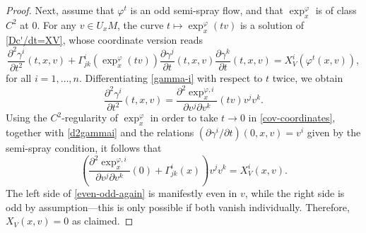 \documentclass[10pt,a4paper]{amsart}
\begin{document}
\begin{proof}
Next, assume that $\varphi^t$ is an odd semi-spray flow, and that $\exp_x^{\varphi}$ is of class $C^2$ at $0$.
For any $v\in U_xM$, the curve $t\mapsto \exp_x^{\varphi}(tv)$ is a solution of \eqref{Dc'/dt=XV}, whose coordinate version reads
\begin{equation}\label{cov-coordinates}
 \frac{\partial^2\gamma^i}{\partial t^2}(t,x,v) + \Gamma_{jk}^i(\exp_x^{\varphi}(tv)) \frac{\partial\gamma^j}{\partial t}(t,x,v)\frac{\partial \gamma^k}{\partial t}(t,x,v) = X^i_V(\varphi^t(x,v)),
\end{equation}for all $i=1,\ldots, n$. Differentiating \eqref{gamma-i} with respect to $t$ twice, we obtain
\begin{equation}\label{d2gammai}
 \frac{\partial^2\gamma^i}{\partial t^2}(t,x,v) =
\frac{\partial^2 \exp_x^{\varphi,i}}{\partial v^j\partial v^k}(tv)v^jv^k.\end{equation}Using the $C^2$-regularity of $\exp_x^{\varphi}$ in order to take $t\to 0$ in \eqref{cov-coordinates}, together with \eqref{d2gammai} and the relations $(\partial \gamma^i/\partial t)(0,x,v) = v^i$ given by the semi-spray condition, it follows that
\begin{equation}\label{even-odd-again}
\left( \frac{\partial^2 \exp_x^{\varphi,i}}{\partial v^j\partial v^k}(0)+\Gamma^i_{jk}(x)\right)v^jv^k= X^i_V(x,v).
\end{equation}The left side of \eqref{even-odd-again} is manifestly even in $v$, while the right side is odd by assumption---this is only possible if both vanish individually. Therefore, $X_V(x,v)=0$ as claimed.
\end{proof}
\end{document}
